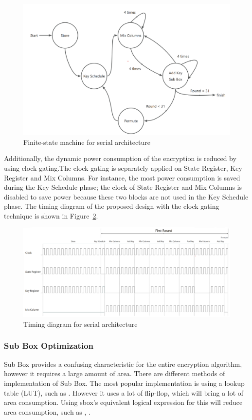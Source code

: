 \documentclass[sn-basic]{sn-jnl}%
\begin{document}
\begin{figure}[h]%
    \caption{Finite-state machine for serial architecture}\label{fig4}
    \centering
    \includegraphics[width=\textwidth]{serial_fsm.png}
\end{figure}

Additionally, the dynamic power consumption of the encryption is reduced by using clock gating.The clock gating is separately applied on State Register, Key Register and Mix Columns. For instance, the most power consumption is saved during the Key Schedule phase; the clock of State Register and Mix Columns is disabled to save power because these two blocks are not used in the Key Schedule phase. The timing diagram of the proposed design with the clock gating technique is shown in Figure~\ref{fig5}.

\begin{figure}[h]%
    \caption{Timing diagram for serial architecture}\label{fig5}
    \centering
    \includegraphics[width=\textwidth]{serial_time.png}
\end{figure}

\subsubsection{Sub Box Optimization }\label{subsubsec1}
Sub Box provides a confusing characteristic for the entire encryption algorithm, however it requires a large amount of area. There are different methods of implementation of Sub Box. The most popular implementation is using a lookup table (LUT), such as \cite{bib17}. However it uses a lot of flip-flop, which will bring a lot of area consumption. Using sbox's equivalent logical expression for this will reduce area consumption, such as \cite{bib15}, \cite{bib16}.
\end{document}
